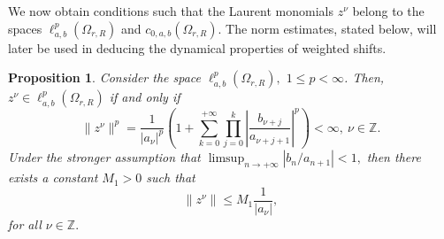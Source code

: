 \documentclass[12pt, reqno]{amsart}
\newtheorem{proposition}[theorem]{Proposition}
\theoremstyle{definition}
\theoremstyle{remark}
\numberwithin{equation}{section}
\begin{document}
We now obtain conditions such that the Laurent monomials $z^{\nu}$ belong to the spaces $\ell^p_{a,b}(\Omega_{r,R})$ and $c_{0,a,b}(\Omega_{r,R})$.  The norm estimates, stated below, will later be used in deducing the dynamical properties of weighted shifts.

\begin{proposition}\label{estimate}
 Consider the space $\ell^{p}_{{a},{b}}(\Omega_{r,R}),$ $1\leq p<\infty$. Then, $z^{\nu}\in \ell^p_{a,b}(\Omega_{r,R})$ if and only if
\[
\|z^{\nu}\|^{p}
=\frac{1}{|a_{\nu}|^{p}}\left(1+\sum_{k=0}^{+\infty}
\prod_{j=0}^{k}
\left|
\frac{b_{\nu+j}}{a_{\nu+j+1}}
\right|^{p}\right)
<\infty, ~\nu \in \mathbb{Z}.
\]
Under the stronger assumption that
$ \limsup_{ n\rightarrow +\infty} \left\lvert b_n/a_{n+1}\right\rvert<1,$ then there exists a constant $M_{1}>0$ such that
   \begin{equation}\label{Estimates-q}
   \lVert z^{\nu}\rVert\leq M_{1}\frac{1}{|a_{\nu}|},
   \end{equation}
   for all $\nu \in \mathbb{Z}.$ 
\end{proposition}
\end{document}
